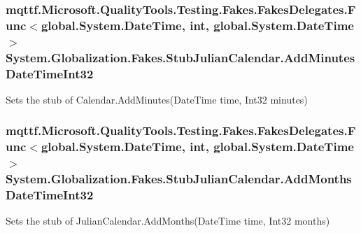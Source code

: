\hypertarget{class_system_1_1_globalization_1_1_fakes_1_1_stub_julian_calendar_acae7efc06783e25cc45ff8a0c8921c39}{
\subsubsection[{Add\-Minutes\-Date\-Time\-Int32}]{\setlength{\rightskip}{0pt plus 5cm}mqttf.\-Microsoft.\-Quality\-Tools.\-Testing.\-Fakes.\-Fakes\-Delegates.\-Func$<$global.\-System.\-Date\-Time, int, global.\-System.\-Date\-Time$>$ System.\-Globalization.\-Fakes.\-Stub\-Julian\-Calendar.\-Add\-Minutes\-Date\-Time\-Int32}}\label{class_system_1_1_globalization_1_1_fakes_1_1_stub_julian_calendar_acae7efc06783e25cc45ff8a0c8921c39}


Sets the stub of Calendar.\-Add\-Minutes(\-Date\-Time time, Int32 minutes)

\hypertarget{class_system_1_1_globalization_1_1_fakes_1_1_stub_julian_calendar_a429934d9b3c0b6df0f21420426710764}{
\subsubsection[{Add\-Months\-Date\-Time\-Int32}]{\setlength{\rightskip}{0pt plus 5cm}mqttf.\-Microsoft.\-Quality\-Tools.\-Testing.\-Fakes.\-Fakes\-Delegates.\-Func$<$global.\-System.\-Date\-Time, int, global.\-System.\-Date\-Time$>$ System.\-Globalization.\-Fakes.\-Stub\-Julian\-Calendar.\-Add\-Months\-Date\-Time\-Int32}}\label{class_system_1_1_globalization_1_1_fakes_1_1_stub_julian_calendar_a429934d9b3c0b6df0f21420426710764}


Sets the stub of Julian\-Calendar.\-Add\-Months(\-Date\-Time time, Int32 months)

